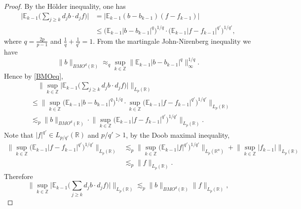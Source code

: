 \documentclass[oneside,english,a4wide]{amsart}
\numberwithin{equation}{section}
\numberwithin{figure}{section}
\theoremstyle{plain}
\theoremstyle{plain}
\theoremstyle{definition}
\theoremstyle{plain}
\theoremstyle{remark}
\theoremstyle{definition}
\theoremstyle{remark}
\theoremstyle{definition}
\newcommand{\8}{\infty}
\begin{document}
\begin{proof}
	By the Hölder inequality, one has
	\begin{equation*}
		\begin{aligned}
			\biggl|\mathbb{E}_{k-1}\biggl(\sum\limits_{j\ge k}d_j{b}\cdot d_j{f}\biggr)\biggr|{}&=|\mathbb{E}_{k-1}(b-b_{k-1})(f-f_{k-1})|\\
			&\le \big(\mathbb{E}_{k-1}|b-b_{k-1}|^q\big)^{1/q}\cdot \big(\mathbb{E}_{k-1}|f-f_{k-1}|^{q'}\big)^{1/{q'}},
		\end{aligned}
	\end{equation*}
	where $q=\frac{2p}{p-1}$ and $\frac{1}{q}+\frac{1}{q'}=1$.
	From the martingale John-Nirenberg inequality we have
	\begin{equation}\label{BMOeq}
		\|b\|_{BMO^d(\mathbb{R})}\approx_q \sup_{k\in \mathbb{Z}}\big\|\mathbb{E}_{k-1}|b-b_{k-1}|^q\big\|_{\infty}^{1/q}.
	\end{equation}
	Hence by \eqref{BMOeq},
	\begin{equation*}
		\begin{aligned}
			{}&\quad\biggl\|\sup_{k\in\mathbb{Z}}\biggl|\mathbb{E}_{k-1}\biggl(\sum_{j\ge k} d_jb\cdot d_jf\biggr)\biggr|\biggr\|_{L_p(\mathbb{R})}\\
			&
			\le \biggl\|\sup_{k\in\mathbb{Z}}\big(\mathbb{E}_{k-1}|b-b_{k-1}|^q\big)^{1/q}\cdot \sup_{k\in\mathbb{Z}}\big(\mathbb{E}_{k-1}|f-f_{k-1}|^{q'}\big)^{1/{q'}}\biggr\|_{L_p(\mathbb{R})}\\
			&\lesssim_p \|b\|_{BMO^d(\mathbb{R})}\cdot \biggl\|\sup_{k\in\mathbb{Z}}\big(\mathbb{E}_{k-1}|f-f_{k-1}|^{q'}\big)^{1/{q'}}\biggr\|_{L_p(\mathbb{R})}.
		\end{aligned}
	\end{equation*}
	Note that $|f|^{q'}\in L_{p/{q'}}(\mathbb{R})$ and $p/{q'}>1$, by the Doob maximal inequality, 
	\begin{equation*}
		\begin{aligned}
			\biggl\|\sup_{k\in\mathbb{Z}}\big(\mathbb{E}_{k-1}|f-f_{k-1}|^{q'}\big)^{1/{q'}}\biggr\|_{L_p(\mathbb{R})}{}
			&\lesssim_p \biggl\|\sup_{k\in\mathbb{Z}}\big(\mathbb{E}_{k-1}|f|^{q'}\big)^{1/{q'}}\biggr\|_{L_p(\mathbb{R}^n)}+\bigl\|\sup_{k\in\mathbb{Z}}|f_{k-1}|\bigr\|_{L_p(\mathbb{R})}\\
			&\lesssim_p \|f\|_{L_p(\mathbb{R})}.
		\end{aligned}
	\end{equation*}
	Therefore
	\begin{equation*}
		\biggl\|\sup_{k\in\mathbb{Z}}\biggl|\mathbb{E}_{k-1}\biggl(\sum_{j\ge k} d_jb\cdot d_jf\biggr)\biggr|\biggr\|_{L_p(\mathbb{R})}\lesssim_{p} \|b\|_{BMO^d(\mathbb{R})}\|f\|_{L_p(\mathbb{R})},

\end{equation*}
\end{proof}
\end{document}
